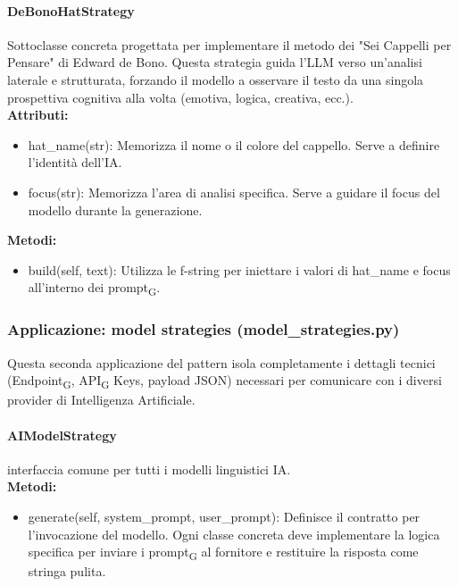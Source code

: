 \documentclass[11pt,a4paper]{article}
\newcommand{\gls}[1]{#1\textsubscript{G}}
\begin{document}
\paragraph{DeBonoHatStrategy}
Sottoclasse concreta progettata per implementare il metodo dei "Sei Cappelli per Pensare" di Edward de Bono. Questa strategia guida l'LLM verso un'analisi laterale e strutturata, forzando il modello a osservare il testo da una singola prospettiva cognitiva alla volta (emotiva, logica, creativa, ecc.).\\
\textbf{Attributi:}
\begin{itemize}
    \item hat\_name(str): Memorizza il nome o il colore del cappello. Serve a definire l'identità dell'IA.
    \item focus(str): Memorizza l'area di analisi specifica. Serve a guidare il focus del modello durante la generazione.
\end{itemize}
\textbf{Metodi:}
\begin{itemize}
    \item build(self, text): Utilizza le f-string per iniettare i valori di hat\_name e focus all'interno dei \gls{prompt}.
\end{itemize}


\subsubsection{Applicazione: model strategies
(model\_strategies.py)}
Questa seconda applicazione del pattern isola completamente i dettagli tecnici (\gls{Endpoint}, \gls{API} Keys, payload JSON) necessari per comunicare con i diversi provider di Intelligenza Artificiale.

\paragraph{AIModelStrategy} interfaccia comune per tutti i modelli linguistici IA.
\\ \textbf{Metodi:}
\begin{itemize}
    \item generate(self, system\_prompt, user\_prompt): Definisce il contratto per l'invocazione del modello. Ogni classe concreta deve implementare la logica specifica per inviare i \gls{prompt} al fornitore e restituire la risposta come stringa pulita.
\end{itemize}
\end{document}
